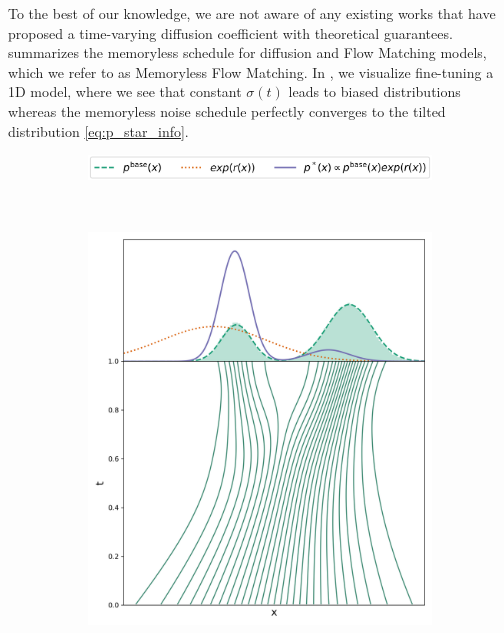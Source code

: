 \documentclass[]{fairmeta}
\begin{document}
To the best of our knowledge, we are not aware of any existing works that have proposed a time-varying diffusion coefficient with theoretical guarantees.
 summarizes the memoryless schedule for diffusion and Flow Matching models, which we refer to as Memoryless Flow Matching. In , we visualize fine-tuning a 1D model, where we see that constant $\sigma(t)$ leads to biased distributions whereas the memoryless noise schedule perfectly converges to the tilted distribution \eqref{eq:p_star_info}. 

\begin{figure}
    \centering
    \begin{subfigure}[t]{\linewidth}
        \centering
        \includegraphics[width=0.7\linewidth]{figs/finetune1d/legend.png}
    \end{subfigure}\\
    \begin{subfigure}[t]{0.25\linewidth}
        \centering
        \includegraphics[width=\linewidth]{figs/finetune1d/pretrained_model.png}

\end{subfigure}
\end{figure}
\end{document}
